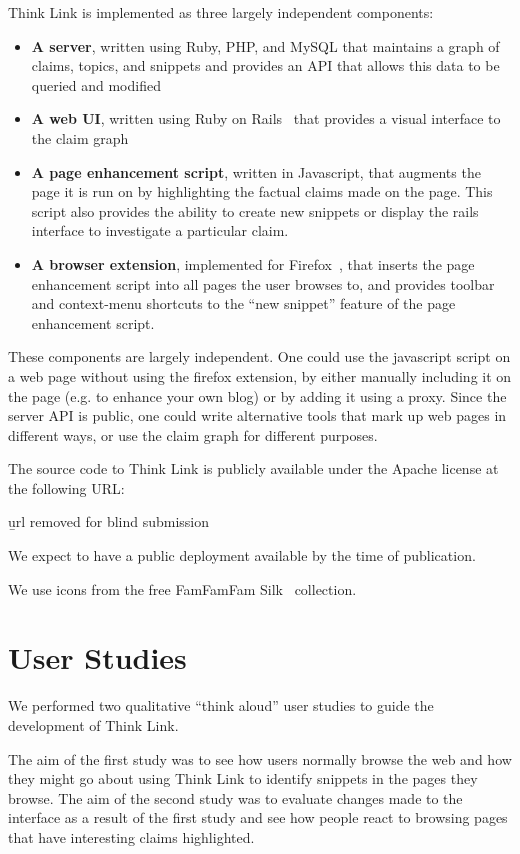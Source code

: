 \documentclass{chi2009}
\begin{document}
Think Link is implemented as three largely independent components:

\begin{itemize}
\item {\bf A server}, written using Ruby, PHP, and MySQL that maintains a graph of claims, topics, and snippets and provides an API that allows this data to be queried and modified
\item {\bf A web UI}, written using Ruby on Rails~\cite{rails} that provides a visual interface to the claim graph
\item {\bf A page enhancement script}, written in Javascript, that augments the page it is run on by highlighting the factual claims made on the page. This script also provides the ability to create new snippets or display the rails interface to investigate a particular claim.
\item {\bf A browser extension}, implemented for Firefox~\cite{firefoxextension}, that inserts the page enhancement script into all pages the user browses to, and provides toolbar and context-menu shortcuts to the ``new snippet'' feature of the page enhancement script.
\end{itemize}

These components are largely independent. One could use the javascript script on a web page without using the firefox extension, by either manually including it on the page (e.g. to enhance your own blog) or by adding it using a proxy. Since the server API is public, one could write alternative tools that mark up web pages in different ways, or use the claim graph for different purposes.

The source code to Think Link is publicly available under the Apache license at the following URL:

{\b url removed for blind submission}

We expect to have a public deployment available by the time of publication.

We use icons from the free FamFamFam Silk~\cite{silkicons} collection.



\section{User Studies}

We performed two qualitative ``think aloud'' user studies to guide the development of Think Link. 

The aim of the first study was to see how users normally browse the web and how they might go about using Think Link to identify snippets in the pages they browse. The aim of the second study was to evaluate changes made to the interface as a result of the first study and see how people react to browsing pages that have interesting claims highlighted.
\end{document}
